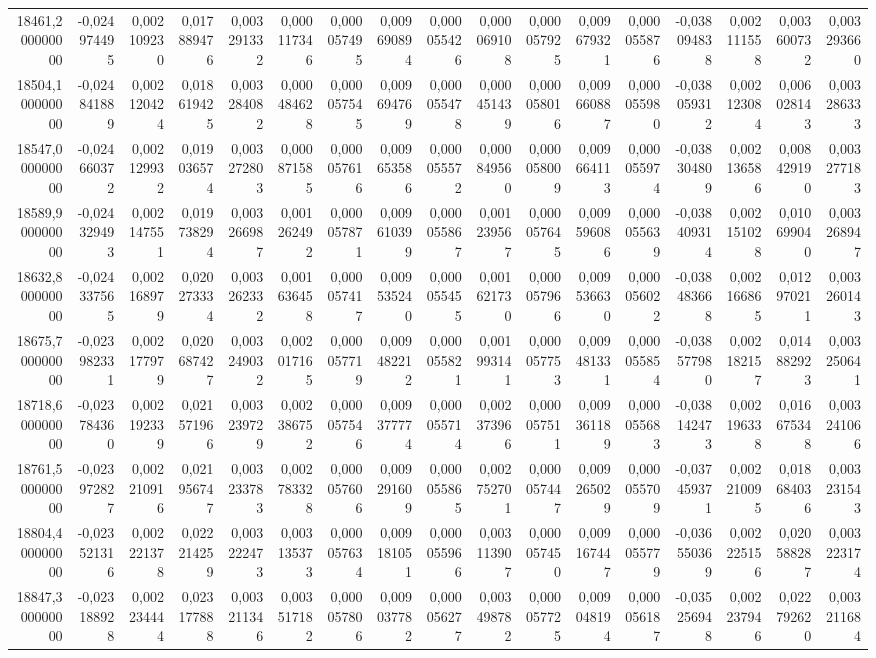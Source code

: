 \begin{longtable}{rrrrrrrrrrrrrrrrr}
18461,200000000 & -0,024974495 & 0,002109230 & 0,017889476 & 0,003291332 & 0,000117346 & 0,000057495 & 0,009690894 & 0,000055426 & 0,000069108 & 0,000057925 & 0,009679321 & 0,000055876 & -0,038094838 & 0,002111558 & 0,003600732 & 0,003293660\\
18504,100000000 & -0,024841889 & 0,002120424 & 0,018619425 & 0,003284082 & 0,000484628 & 0,000057545 & 0,009694769 & 0,000055478 & 0,000451439 & 0,000058016 & 0,009660887 & 0,000055980 & -0,038059312 & 0,002123084 & 0,006028143 & 0,003286333\\
18547,000000000 & -0,024660372 & 0,002129932 & 0,019036574 & 0,003272803 & 0,000871585 & 0,000057616 & 0,009653586 & 0,000055572 & 0,000849560 & 0,000058009 & 0,009664113 & 0,000055974 & -0,038304809 & 0,002136586 & 0,008429190 & 0,003277183\\
18589,900000000 & -0,024329493 & 0,002147551 & 0,019738294 & 0,003266987 & 0,001262492 & 0,000057871 & 0,009610399 & 0,000055867 & 0,001239567 & 0,000057645 & 0,009596086 & 0,000055639 & -0,038409314 & 0,002151028 & 0,010699040 & 0,003268947\\
18632,800000000 & -0,024337565 & 0,002168979 & 0,020273334 & 0,003262332 & 0,001636458 & 0,000057417 & 0,009535240 & 0,000055455 & 0,001621730 & 0,000057966 & 0,009536630 & 0,000056022 & -0,038483668 & 0,002166865 & 0,012970211 & 0,003260143\\
18675,700000000 & -0,023982331 & 0,002177979 & 0,020687427 & 0,003249032 & 0,002017165 & 0,000057719 & 0,009482212 & 0,000055821 & 0,001993141 & 0,000057753 & 0,009481331 & 0,000055854 & -0,038577980 & 0,002182157 & 0,014882923 & 0,003250641\\
18718,600000000 & -0,023784360 & 0,002192339 & 0,021571966 & 0,003239729 & 0,002386752 & 0,000057546 & 0,009377774 & 0,000055714 & 0,002373966 & 0,000057511 & 0,009361189 & 0,000055683 & -0,038142473 & 0,002196338 & 0,016675348 & 0,003241066\\
18761,500000000 & -0,023972827 & 0,002210916 & 0,021956747 & 0,003233783 & 0,002783328 & 0,000057606 & 0,009291609 & 0,000055865 & 0,002752701 & 0,000057447 & 0,009265029 & 0,000055709 & -0,037459371 & 0,002210095 & 0,018684036 & 0,003231543\\
18804,400000000 & -0,023521316 & 0,002221378 & 0,022214259 & 0,003222473 & 0,003135373 & 0,000057634 & 0,009181051 & 0,000055966 & 0,003113907 & 0,000057450 & 0,009167447 & 0,000055779 & -0,036550369 & 0,002225156 & 0,020588287 & 0,003223174\\
18847,300000000 & -0,023188928 & 0,002234444 & 0,023177888 & 0,003211346 & 0,003517182 & 0,000057806 & 0,009037782 & 0,000056277 & 0,003498782 & 0,000057725 & 0,009048194 & 0,000056187 & -0,035256948 & 0,002237946 & 0,022792620 & 0,003211684\\

\end{longtable}
